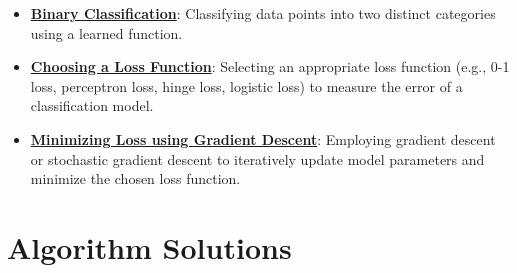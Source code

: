 \documentclass{article}%
\begin{document}
\begin{itemize}[leftmargin=*]
\item \href{https://purdue.brightspace.com/d2l/common/assets/pdfjs-d2l-dist/1.0.14-legacy/web/viewer.html?file=\%2Fcontent\%2Fenforced\%2F1095467-wl.202510.CS.24300.001\%2F05L2-ML Basics.pdf\%3Fou\%3D1095467\&lang=en-us\&container=d2l-fileviewer-rendered-pdf\&fullscreen=d2l-fileviewer-rendered-pdf-dialog\&height=667#page=20}{\textbf{Binary Classification}}: Classifying data points into two distinct categories using a learned function.%
\item \href{https://purdue.brightspace.com/d2l/common/assets/pdfjs-d2l-dist/1.0.14-legacy/web/viewer.html?file=\%2Fcontent\%2Fenforced\%2F1095467-wl.202510.CS.24300.001\%2F05L2-ML Basics.pdf\%3Fou\%3D1095467\&lang=en-us\&container=d2l-fileviewer-rendered-pdf\&fullscreen=d2l-fileviewer-rendered-pdf-dialog\&height=667#page=25}{\textbf{Choosing a Loss Function}}: Selecting an appropriate loss function (e.g., 0{-}1 loss, perceptron loss, hinge loss, logistic loss) to measure the error of a classification model.%
\item \href{https://purdue.brightspace.com/d2l/common/assets/pdfjs-d2l-dist/1.0.14-legacy/web/viewer.html?file=\%2Fcontent\%2Fenforced\%2F1095467-wl.202510.CS.24300.001\%2F05L2-ML Basics.pdf\%3Fou\%3D1095467\&lang=en-us\&container=d2l-fileviewer-rendered-pdf\&fullscreen=d2l-fileviewer-rendered-pdf-dialog\&height=667#page=28}{\textbf{Minimizing Loss using Gradient Descent}}: Employing gradient descent or stochastic gradient descent to iteratively update model parameters and minimize the chosen loss function.%
\end{itemize}

%
\section{Algorithm Solutions}%
\label{sec:AlgorithmSolutions}%
\end{document}
